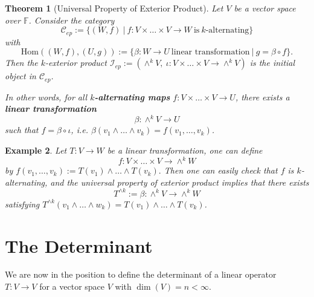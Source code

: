 \documentclass[12pt]{amsbook}
\newtheorem{theorem}{Theorem}[section]
\newtheorem{example}[theorem]{Example}
\begin{document}
\begin{theorem}[Universal Property of Exterior Product]
    Let $V$ be a vector space over $\mathbb{F}$. Consider the category
    $$\mathcal{C}_{ep} := \{(W,f)\ |\ f: V \times \dots \times V \to W\ \text{is}\ k\text{-alternating}\}$$
with
$$\mathrm{Hom}((W,f),(U,g)) := \{\beta : W \to U\ \text{linear transformation}\ |\ g = \beta \circ f\}.$$
Then the $k$-exterior product $\mathcal{I}_{ep} := (\wedge^k V,\ \iota: V \times \dots \times V \to \wedge^k V)$ is the initial object in $\mathcal{C}_{ep}$. 

In other words, for all {\bf $k$-alternating maps} $f: V \times \dots \times V \to U$, there exists a {\bf linear transformation} 
$$\beta: \wedge^k V  \to U$$
such that $f = \beta \circ \iota$, i.e. $\beta(v_1 \wedge \dots \wedge v_k) = f(v_1, \dots, v_k)$.
\end{theorem}

\begin{example}
Let $T: V \to W$ be a linear transformation, one can define
$$f: V \times \dots \times V \to \wedge^k W$$
by $f(v_1, \dots, v_k) := T(v_1) \wedge \dots \wedge T(v_k).$
Then one can easily check that $f$ is $k$-alternating, and the universal property of exterior product implies that there exists 
$$T^{\wedge k} := \beta: \wedge^k V \to \wedge^k W$$
satisfying $T^{\wedge k}(v_1 \wedge \dots \wedge w_k) = T(v_1) \wedge \dots \wedge T(v_k)$.
\end{example}

\section{The Determinant} \label{sec-det}
We are now in the position to define the determinant of a linear operator $T:V \to V$ for a vector space $V$ with $\dim(V) = n < \infty$.
\end{document}
